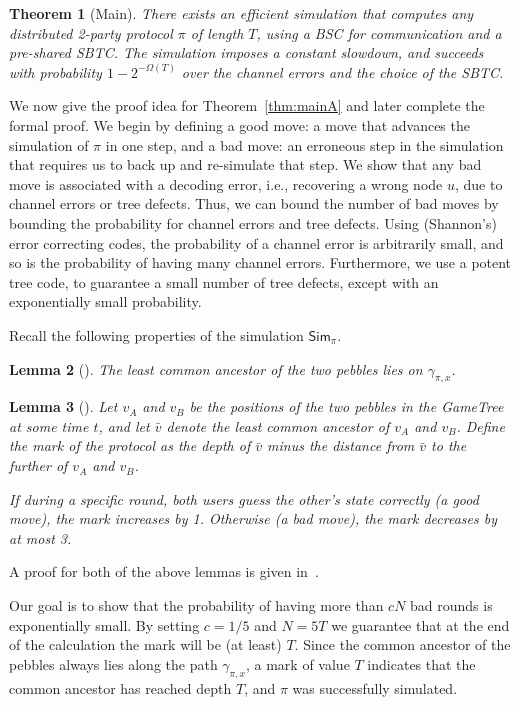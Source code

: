 \documentclass[ letterpaper, 11pt]{article}
\newtheorem{theorem}{Theorem}[section]
\newtheorem{lemma}[theorem]{Lemma}
\newcommand{\gametree}{\textsf{GameTree}\xspace}
\newcommand{\potent}{potent\xspace}
\newcommand{\Sim}{{\mathsf{Sim}_\pi}}
\newcommand{\KTC}{\textsf{SBTC}\xspace}
\begin{document}
\begin{theorem}[Main]\label{thm:main}
There exists an efficient simulation that computes any distributed 2-party protocol $\pi$ of length $T$,
using a BSC for communication and a pre-shared \KTC. The simulation imposes a constant slowdown,
and succeeds with probability $1-2^{-\Omega(T)}$ over the channel errors and the choice of the \KTC.
\end{theorem}

We now give the proof idea  for Theorem~\ref{thm:mainA} and later complete the formal proof.
We begin by defining a good move: a move that advances the simulation of $\pi$ in one step,
and a bad move: an erroneous step in the simulation that requires us to back up and re-simulate
that step. We show that any bad move is associated with a decoding error,
i.e., recovering a wrong node $u$, due to channel errors or tree defects.
Thus, we can bound the number of bad moves by bounding the probability for
channel errors and tree defects.
Using (Shannon's) error correcting codes, the probability of a channel error is arbitrarily small,
and so is the probability of having many channel errors.
Furthermore, we use a \potent tree code, to guarantee
a small number of tree defects, except with an exponentially small probability.



\vspace{1em}




Recall the following properties of the simulation $\Sim$.
\begin{lemma}[\cite{schulman96}] \label{lem:lcaOnTrack}
The least common ancestor of the two pebbles lies on $\gamma_{\pi,x}$.
\end{lemma}
\begin{lemma}[\cite{schulman96}]\label{lem:moves}
Let $v_A$ and $v_B$ be the positions of the two pebbles in the \gametree at some time $t$,
and let $\bar v$ denote the least common ancestor of $v_A$ and $v_B$.
Define the {\em mark} of the protocol as the depth of $\bar v$ minus the
distance from $\bar v$ to the further of $v_A$ and $v_B$.

If during a specific round, both users guess the other's state correctly
(a {\em good} move), the mark increases by 1.
Otherwise (a {\em bad} move), the mark decreases by at most 3.
\end{lemma}
\noindent A proof for  both of the above lemmas is given in~\cite{schulman96}.

Our goal is to show that the probability of having more than $cN$ bad rounds
is exponentially small. By setting $c=1/5$ and $N=5T$ we guarantee
that  at the end of the calculation the mark will be (at least) $T$.
Since the common ancestor of the pebbles always lies along the path $\gamma_{\pi,x}$,
a mark of value $T$  indicates that the common ancestor has reached depth $T$,
and $\pi$ was successfully simulated.
\end{document}
